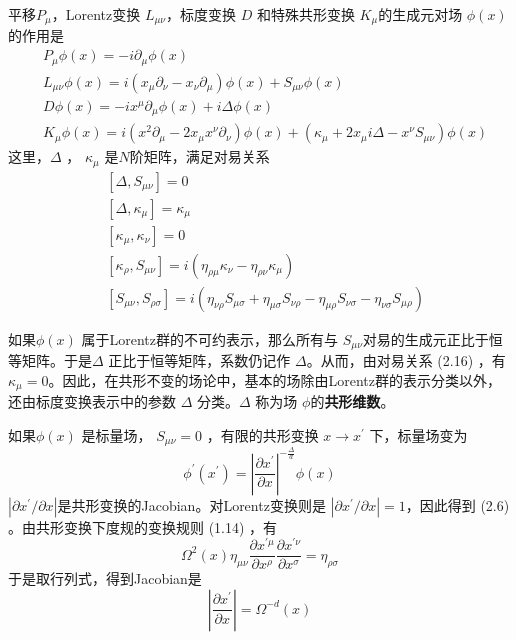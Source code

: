 平移$P_\mu $，Lorentz变换 $L_{\mu\nu} $，标度变换 $D$ 和特殊共形变换 $K_\mu $的生成元对场 $\phi(x)$ 的作用是
\begin{align} &P_{\mu} \phi(x)=-i \partial_{\mu} \phi(x)\\ &L_{\mu \nu} \phi(x)=i\left(x_{\mu} \partial_{\nu}-x_{\nu} \partial_{\mu}\right) \phi(x)+S_{\mu \nu} \phi(x)\\ &D \phi(x)=-i x^{\mu} \partial_{\mu} \phi(x)+i \Delta \phi(x)\\ &K_{\mu} \phi(x)=i\left(x^{2} \partial_{\mu}-2 x_{\mu} x^{\nu} \partial_{\nu}\right) \phi(x) +\left(\kappa_{\mu}+2 x_{\mu} i \Delta-x^{\nu} S_{\mu \nu}\right) \phi(x) \end{align}
这里，$ \Delta$ ， $\kappa_\mu$ 是$ N $阶矩阵，满足对易关系
\begin{align} &\left[\Delta, S_{\mu \nu}\right]=0 \\ &\left[\Delta, \kappa_{\mu}\right]=\kappa_{\mu} \\ &\left[\kappa_{\mu}, \kappa_{\nu}\right]=0\\ &\left[\kappa_{\rho}, S_{\mu \nu}\right]=i\left( \eta_{\rho \mu} \kappa_{\nu}-\eta_{\rho \nu} \kappa_{\mu}\right) \\ &\left[S_{\mu \nu}, S_{\rho \sigma}\right]=i\left(\eta_{\nu \rho} S_{\mu \sigma}+\eta_{\mu \sigma} S_{\nu \rho}-\eta_{\mu \rho} S_{\nu \sigma}-\eta_{\nu \sigma} S_{\mu \rho}\right) \end{align}

如果$ \phi(x)$ 属于Lorentz群的不可约表示，那么所有与 $S_{\mu\nu} $对易的生成元正比于恒等矩阵。于是$ \Delta$ 正比于恒等矩阵，系数仍记作 $\Delta $。从而，由对易关系 (2.16) ，有 $\kappa_\mu=0 $。因此，在共形不变的场论中，基本的场除由Lorentz群的表示分类以外，还由标度变换表示中的参数 $\Delta$ 分类。$ \Delta$ 称为场 $\phi $的\textbf{共形维数}。

如果$ \phi(x)$ 是标量场， $S_{\mu\nu}=0$ ，有限的共形变换 $x\to x^\prime$ 下，标量场变为
\begin{equation}
		\phi^{\prime}\left(x^{\prime}\right)=\left|\frac{\partial x^{\prime}}{\partial x}\right|^{-\frac{\Delta}{d}} \phi(x)
\end{equation}
$| \partial x^{\prime}/\partial x |$是共形变换的Jacobian。对Lorentz变换则是 $| \partial x^{\prime}/\partial x |=1 $，因此得到 (2.6) 。由共形变换下度规的变换规则 (1.14) ，有
\begin{equation}
	\Omega^{2}(x) \eta_{\mu \nu} \frac{\partial x^{\prime \mu}}{\partial x^{\rho}} \frac{\partial x^{\prime \nu}}{\partial x^{\sigma}}=\eta_{\rho \sigma}
\end{equation}
于是取行列式，得到Jacobian是
\begin{equation}
	\left|\frac{\partial x^{\prime}}{\partial x}\right|=\Omega^{-d}(x)
\end{equation}

